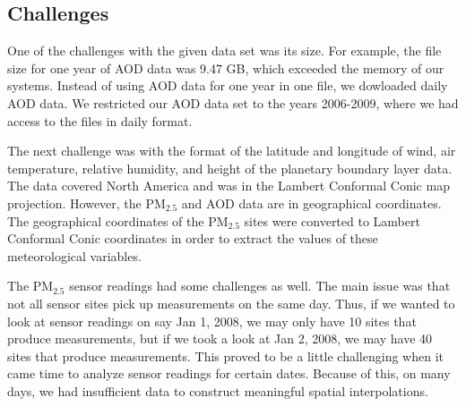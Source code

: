 \documentclass[10pt]{article}
\newcommand{\kelly}[1]{{\color{blue}{Kelly: {#1}}}}
\begin{document}
\subsection{Challenges}
One of the challenges with the given data set was its size. For example, the file size for one year of AOD data was 9.47 GB, which exceeded the memory of our systems. Instead of using AOD data for one year in one file, we dowloaded daily AOD data. We restricted our AOD data set to the years 2006-2009, where we had access to the files in daily format. %

The next challenge was with the format of the latitude and longitude of wind, air temperature, relative humidity, and height of the planetary boundary layer data. The data covered North America and was in the Lambert Conformal Conic map projection. However, the PM$_{2.5}$ and AOD data are in geographical coordinates. The geographical coordinates of the PM$_{2.5}$ sites were converted to Lambert Conformal Conic coordinates in order to extract the values of these meteorological variables. 

The PM$_{2.5}$ sensor readings had some challenges as well. The main issue was that not all sensor sites pick up measurements on the same day. Thus, if we wanted to look at sensor readings on say Jan 1, 2008, we may only have 10 sites that produce measurements, but if we took a look at Jan 2, 2008, we may have 40 sites that produce measurements. This proved to be a little challenging when it came time to analyze sensor readings for certain dates. Because of this, on many days, we had insufficient data to construct meaningful spatial interpolations.
\end{document}
